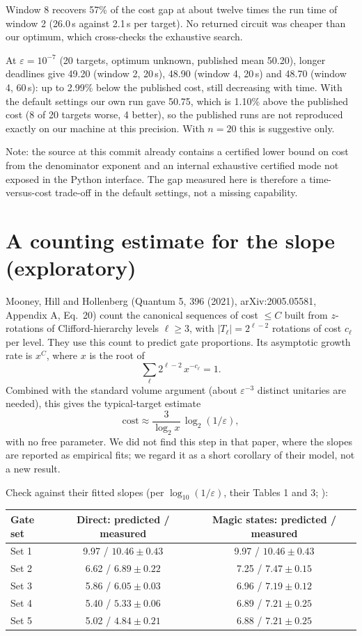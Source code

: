 \documentclass[11pt,a4paper]{article}
\newcommand{\file}[1]{\texttt{\detokenize{#1}}}
\begin{document}
Window 8 recovers 57\% of the cost gap at about twelve times the run time of window 2 (26.0\,s
against 2.1\,s per target). No returned circuit was cheaper than our optimum, which cross-checks the
exhaustive search.

At $\varepsilon = 10^{-7}$ (20 targets, optimum unknown, published mean 50.20), longer deadlines give
49.20 (window 2, 20\,s), 48.90 (window 4, 20\,s) and 48.70 (window 4, 60\,s): up to 2.99\% below the
published cost, still decreasing with time. With the default settings our own run gave 50.75, which
is 1.10\% above the published cost (8 of 20 targets worse, 4 better), so the published runs are not
reproduced exactly on our machine at this precision. With $n = 20$ this is suggestive only.

Note: the source at this commit already contains a certified lower bound on cost from the denominator
exponent and an internal exhaustive certified mode not exposed in the Python interface. The gap
measured here is therefore a time-versus-cost trade-off in the default settings, not a missing
capability.

\section*{A counting estimate for the slope (exploratory)}

Mooney, Hill and Hollenberg (Quantum 5, 396 (2021), arXiv:2005.05581, Appendix A, Eq.~20) count the
canonical sequences of cost $\le C$ built from $z$-rotations of Clifford-hierarchy levels
$\ell \ge 3$, with $|T_\ell| = 2^{\ell-2}$ rotations of cost $c_\ell$ per level. They use this count
to predict gate proportions. Its asymptotic growth rate is $x^C$, where $x$ is the root of
\[
  \sum_{\ell} 2^{\ell-2}\, x^{-c_\ell} = 1 .
\]
Combined with the standard volume argument (about $\varepsilon^{-3}$ distinct unitaries are needed),
this gives the typical-target estimate
\[
  \text{cost} \approx \frac{3}{\log_2 x}\,\log_2(1/\varepsilon),
\]
with no free parameter. We did not find this step in that paper, where the slopes are reported as
empirical fits; we regard it as a short corollary of their model, not a new result.

Check against their fitted slopes (per $\log_{10}(1/\varepsilon)$, their Tables 1 and 3;
\file{l5_lei_cambio.py}):

\begin{center}
\begin{tabular}{lcc}
\toprule
Gate set & Direct: predicted / measured & Magic states: predicted / measured \\
\midrule
Set 1 & 9.97 / $10.46 \pm 0.43$ & 9.97 / $10.46 \pm 0.43$ \\
Set 2 & 6.62 / $6.89 \pm 0.22$ & 7.25 / $7.47 \pm 0.15$ \\
Set 3 & 5.86 / $6.05 \pm 0.03$ & 6.96 / $7.19 \pm 0.12$ \\
Set 4 & 5.40 / $5.33 \pm 0.06$ & 6.89 / $7.21 \pm 0.25$ \\
Set 5 & 5.02 / $4.84 \pm 0.21$ & 6.88 / $7.21 \pm 0.25$ \\
\bottomrule
\end{tabular}
\end{center}
\end{document}
